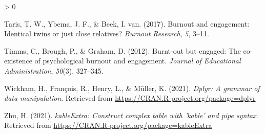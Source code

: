 \documentclass[
  english,
  man]{apa6}
\newlength{\cslhangindent}
\newenvironment{CSLReferences}[2] %
 {%
  \setlength{\parindent}{0pt}
  \ifodd #1 \everypar{\setlength{\hangindent}{\cslhangindent}}\ignorespaces\fi
  \ifnum #2 > 0
  \setlength{\parskip}{#2\baselineskip}
  \fi
 }%
 {}
\begin{document}
\begin{CSLReferences}{1}{0}
\leavevmode\hypertarget{ref-taris2017burnout}{}%
Taris, T. W., Ybema, J. F., \& Beek, I. van. (2017). Burnout and engagement: Identical twins or just close relatives? \emph{Burnout Research}, \emph{5}, 3--11.

\leavevmode\hypertarget{ref-timms2012burnt}{}%
Timms, C., Brough, P., \& Graham, D. (2012). Burnt-out but engaged: The co-existence of psychological burnout and engagement. \emph{Journal of Educational Administration}, \emph{50}(3), 327--345.

\leavevmode\hypertarget{ref-R-dplyr}{}%
Wickham, H., François, R., Henry, L., \& Müller, K. (2021). \emph{Dplyr: A grammar of data manipulation}. Retrieved from \url{https://CRAN.R-project.org/package=dplyr}

\leavevmode\hypertarget{ref-R-kableExtra}{}%
Zhu, H. (2021). \emph{kableExtra: Construct complex table with 'kable' and pipe syntax}. Retrieved from \url{https://CRAN.R-project.org/package=kableExtra}

\end{CSLReferences}

\endgroup
\end{document}

